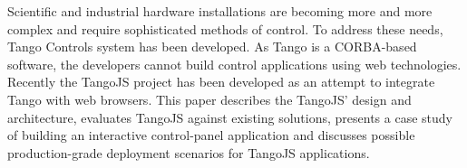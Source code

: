 
Scientific and industrial hardware installations are becoming more and more
complex and require sophisticated methods of control. To address these needs,
Tango Controls system has been developed. As Tango is a CORBA-based software,
the developers cannot build control applications using web technologies.
Recently the TangoJS project has been developed as an attempt to integrate
Tango with web browsers. This paper describes the TangoJS' design and
architecture, evaluates TangoJS against existing solutions,
presents a case study of building an interactive control-panel application
and discusses possible production-grade deployment scenarios for TangoJS
applications.
